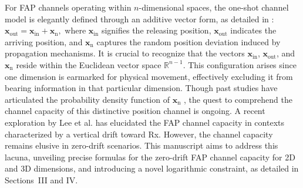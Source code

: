 \documentclass[conference]{IEEEtran}
\theoremstyle{definition}
\theoremstyle{plain}
\begin{document}
\color{black}
For FAP channels operating within \(n\)-dimensional spaces, the one-shot channel model is elegantly defined through an additive vector form, as detailed in \cite{lee2022arrival}:
$
    \mathbf{x}_{\text{out}} = \mathbf{x}_{\text{in}} + \mathbf{x}_{\text{n}},
$
where \(\mathbf{x}_{\text{in}}\) signifies the releasing position, \(\mathbf{x}_{\text{out}}\) indicates the arriving position, and \(\mathbf{x}_{\text{n}}\) captures the random position deviation induced by propagation mechanisms. 
It is crucial to recognize that the vectors \(\mathbf{x}_{\text{in}}\), \(\mathbf{x}_{\text{out}}\), and \(\mathbf{x}_{\text{n}}\) reside within the Euclidean vector space \(\mathbb{R}^{n-1}\). This configuration arises since one dimension is earmarked for physical movement, effectively excluding it from bearing information in that particular dimension.
Though past studies have articulated the probability density function of \(\mathbf{x}_{\text{n}}\) \cite{lee2016distribution,pandey2018molecular,lee2022arrival}, the quest to comprehend the channel capacity of this distinctive position channel is ongoing. A recent exploration by Lee et al. \cite{lee2023char} has elucidated the FAP channel capacity in contexts characterized by a vertical drift toward Rx. However, the channel capacity remains elusive in zero-drift scenarios. This manuscript aims to address this lacuna, unveiling precise formulas for the zero-drift FAP channel capacity for 2D and 3D dimensions, and introducing a novel logarithmic constraint, as detailed in Sections~III and IV.
\color{black}

\end{document}

